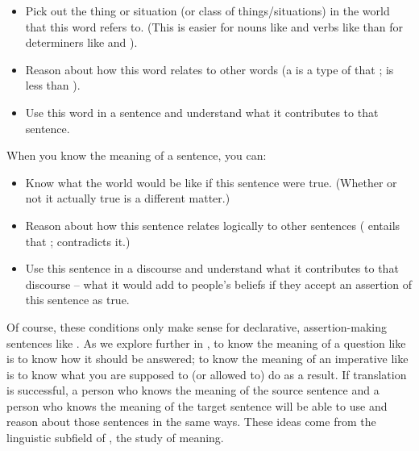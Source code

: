 \begin{itemize}

\item Pick out the thing or situation (or class of things/situations) in the world that this word refers to. (This is easier for nouns like  and verbs like  than for determiners like  and ).

\item Reason about how this word relates to other words (a  is a type of  that ;  is less than ).

\item Use this word in a sentence and understand what it contributes to that sentence.

\end{itemize}

When you know the meaning of a  sentence, you can:

\begin{itemize}

\item Know what the world would be like if this sentence were true.  (Whether or not it actually  true is a different matter.)

\item Reason about how this sentence relates logically to other sentences ( entails that ;  contradicts it.)

\item Use this sentence in a discourse and understand what it contributes to that discourse -- what it would add to people's beliefs if they accept an assertion of this sentence as true.

\end{itemize}

Of course, these conditions only make sense for declarative, assertion-making sentences like . As we explore further in , to know the meaning of a question like  is to know how it should be answered; 
to know the meaning of an imperative like  is to know what you are supposed to (or allowed to) do as a result.   If translation is successful, a person who knows the meaning of the source sentence and a person who knows the meaning of the target sentence will be able to use and reason about those sentences in the same ways.  These ideas come from the  linguistic subfield of
, the study of meaning.


